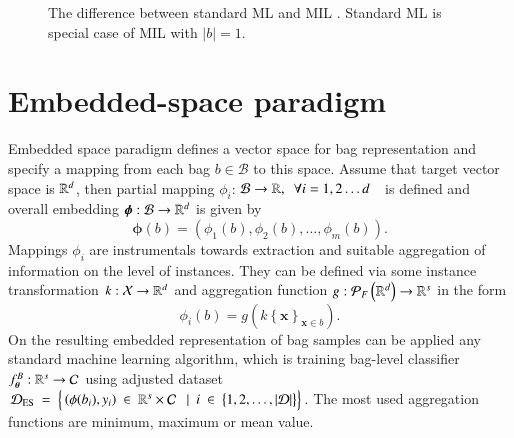 \begin{figure}[h]
	\centering
	\caption{The difference between standard ML and MIL \cite{mandlik}. Standard ML is special case of MIL with $\vert b \vert = 1$. }%
	\label{ggm}%
\end{figure}
\section{Embedded-space paradigm}
Embedded space paradigm \cite{mandlik} defines a vector space for bag representation and specify a mapping from each bag $b\in \mathcal{B}$ to this space. Assume that target vector space is $\mathbb{R}^d$, then partial mapping $\phi_i$: $\mathcal{B} \to \mathbb{R},~~\forall i=1,2\dots d$~~is defined and overall embedding $\boldsymbol{\phi}: \mathcal{B} \to \mathbb{R}^d $ is given by
\begin{equation}
	\boldsymbol{\phi}(b) = \left(\phi_1(b), \phi_2(b), \dots, \phi_m(b)\right).
\end{equation}
Mappings $\phi_i$ are instrumentals towards extraction and suitable aggregation of information on the level of instances. They can be defined via some instance transformation $k:\mathcal{X}\to \mathbb{R}^d$ and aggregation function $g:\mathcal{P}_F\left(\mathbb{R}^d\right) \to \mathbb{R}^s$ in the form 
\begin{equation}
	\phi_i(b)=g\left( k\left\{\boldsymbol{x}\right\}_{\boldsymbol{x} \in b}\right).
\end{equation}
On the resulting embedded representation of bag samples can be applied any standard machine learning algorithm, which is training bag-level classifier $f_{\boldsymbol{\theta}}^B :\mathbb{R}^s \to \mathcal{C}$ using adjusted dataset $\mathcal{D}_{\mathrm{ES}}~=~\Big\lbrace \left(\phi(b_i), y_i\right)~\in~\R^s\times\mathcal{C}~\ ~|~\ i~\in~\big\lbrace 1,2,\dots,\vert\mathcal{D}\vert\big\rbrace\Big\rbrace$. The most used aggregation functions are minimum, maximum or mean value.
